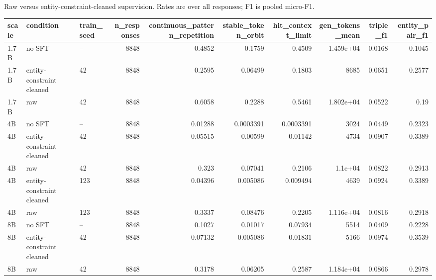 \caption{Raw versus entity-constraint-cleaned supervision. Rates are over all responses; F1 is pooled micro-F1.}
\begin{tabular}{lllrrrrrrr}
\toprule
scale & condition & train\_seed & n\_responses & continuous\_pattern\_repetition & stable\_token\_orbit & hit\_context\_limit & gen\_tokens\_mean & triple\_f1 & entity\_pair\_f1 \\
\midrule
1.7B & no SFT & -- & 8848 & 0.4852 & 0.1759 & 0.4509 & 1.459e+04 & 0.0168 & 0.1045 \\
1.7B & entity-constraint cleaned & 42 & 8848 & 0.2595 & 0.06499 & 0.1803 & 8685 & 0.0651 & 0.2577 \\
1.7B & raw & 42 & 8848 & 0.6058 & 0.2288 & 0.5461 & 1.802e+04 & 0.0522 & 0.19 \\
4B & no SFT & -- & 8848 & 0.01288 & 0.0003391 & 0.0003391 & 3024 & 0.0449 & 0.2323 \\
4B & entity-constraint cleaned & 42 & 8848 & 0.05515 & 0.00599 & 0.01142 & 4734 & 0.0907 & 0.3389 \\
4B & raw & 42 & 8848 & 0.323 & 0.07041 & 0.2106 & 1.1e+04 & 0.0822 & 0.2913 \\
4B & entity-constraint cleaned & 123 & 8848 & 0.04396 & 0.005086 & 0.009494 & 4639 & 0.0924 & 0.3389 \\
4B & raw & 123 & 8848 & 0.3337 & 0.08476 & 0.2205 & 1.116e+04 & 0.0816 & 0.2918 \\
8B & no SFT & -- & 8848 & 0.1027 & 0.01017 & 0.07934 & 5514 & 0.0409 & 0.2228 \\
8B & entity-constraint cleaned & 42 & 8848 & 0.07132 & 0.005086 & 0.01831 & 5166 & 0.0974 & 0.3539 \\
8B & raw & 42 & 8848 & 0.3178 & 0.06205 & 0.2587 & 1.184e+04 & 0.0866 & 0.2978 \\
\bottomrule
\end{tabular}
